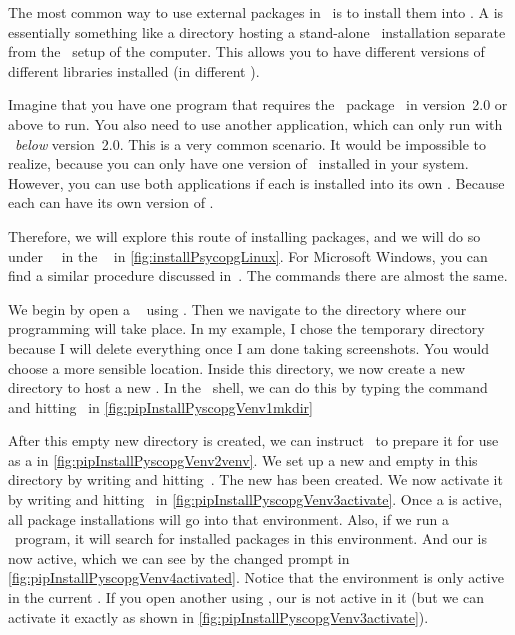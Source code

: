 The most common way to use external packages in \python\ is to install them into .
A  is essentially something like a directory hosting a stand-alone \python\ installation separate from the \python\ setup of the computer.
This allows you to have different versions of different libraries installed (in different ).

Imagine that you have one program that requires the \python\ package \numpy\ in version~2.0 or above to run.
You also need to use another application, which can only run with \numpy\ \emph{below} version~2.0.
This is a very common scenario.
It would be impossible to realize, because you can only have one version of \numpy\ installed in your system.
However, you can use both applications if each is installed into its own .
Because each  can have its own version of \numpy.

Therefore, we will explore this route of installing packages, and we will do so under \ubuntu\ \linux\ in the \bash\  in \cref{fig:installPsycopgLinux}.
For Microsoft Windows, you can find a similar procedure discussed in~\cite{programmingWithPython}.
The commands there are almost the same.

We begin by open a \bash\  using \ubuntuTerminal.
Then we navigate to the directory where our programming will take place.
In my example, I chose the temporary directory  because I will delete everything once I am done taking screenshots.
You would choose a more sensible location.
Inside this directory, we now create a new directory  to host a new .
In the \bash\ shell, we can do this by typing the command  and hitting~\keys{\enter} in \cref{fig:pipInstallPyscopgVenv1mkdir}

After this empty new directory is created, we can instruct \python\ to prepare it for use as a  in \cref{fig:pipInstallPyscopgVenv2venv}.
We set up a new and empty  in this directory by writing  and hitting~\keys{\enter}.
The new  has been created.
We now activate it by writing  and hitting~\keys{\enter} in \cref{fig:pipInstallPyscopgVenv3activate}.
Once a  is active, all package installations will go into that environment.
Also, if we run a \python\ program, it will search for installed packages in this environment.
And our   is now active, which we can see by the changed prompt in \cref{fig:pipInstallPyscopgVenv4activated}.
Notice that the environment is only active in the current .
If you open another  using \ubuntuTerminal, our  is not active in it (but we can activate it exactly as shown in \cref{fig:pipInstallPyscopgVenv3activate}).

